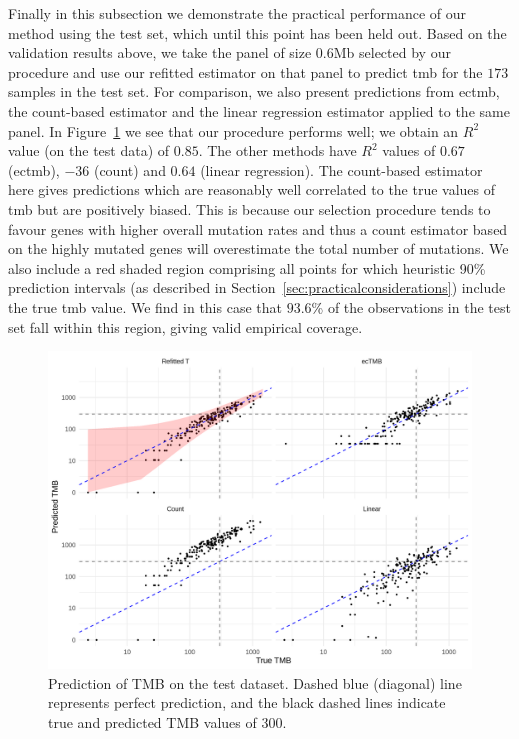 \documentclass[../thesis.tex]{subfiles}
\begin{document}
Finally in this subsection we demonstrate the practical performance of our method using the test set, which until this point has been held out. Based on the validation results above, we take the panel of size 0.6Mb selected by our procedure and use our refitted estimator on that panel to predict \gls{tmb} for the $173$  samples in the test set. For comparison, we also present predictions from \gls{ectmb}, the count-based estimator and the linear regression estimator applied to the same panel.  In Figure~\ref{fig:8} we see that our procedure performs well; we obtain an $R^2$ value (on the test data) of $0.85$.  The other methods have $R^2$ values of $0.67$ (\gls{ectmb}), $-36$ (count) and $0.64$ (linear regression).
The count-based estimator here gives predictions which are reasonably well correlated to the true values of \gls{tmb} but are positively biased. %
 {This is because our selection procedure tends to favour genes with higher overall mutation rates and thus a count estimator based on the highly mutated genes will overestimate the  total number of mutations.} We also include a red shaded region comprising all points for which heuristic 90\% prediction intervals (as described in Section~\ref{sec:practicalconsiderations}) include the true \gls{tmb} value. We find in this case that $93.6$\% of the observations in the test set fall within this region, giving valid empirical coverage.

\begin{figure}[htbp]
\centering
\includegraphics[width=5.5in]{../figures/chapter3/fig8.png}
\vspace*{-5mm}
\caption{Prediction of TMB on the test dataset. Dashed blue (diagonal) line represents perfect prediction, and the black dashed lines indicate true and predicted TMB values of 300. \label{fig:8}}
\vspace*{-2mm}
\end{figure} 
\end{document}
